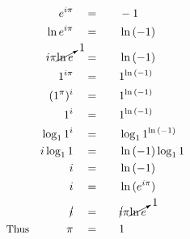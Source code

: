 \begin{alignat*}{5}
&\,&e^{i\pi}\quad&=\quad&&-1\\
&\,&\ln{e^{i\pi}}\quad&=&&\ln{(-1)}\\
&\,&i\pi\cancelto{1}{\ln{e}}\quad&=&&\ln{(-1)}\\
&\,&1^{i\pi}\quad&=&&1^{\ln{(-1)}}\\
&\,&(1^\pi)^i\quad&=&&1^{\ln{(-1)}}\\
&\,&1^i\quad&=&&1^{\ln{(-1)}}\\
&\,&\log_{1}1^i\quad&=&&\log_{1}1^{\ln{(-1)}}\\
&\,&i\log_{1}1\quad&=&&\ln{(-1)}\log_{1}1\\
&\,&i\quad&=&&\ln{(-1)}\\
&\,&i\quad&=&&\ln{(e^{i\pi})}\\
&\,&\cancel{i}\quad&=&&\cancel{i}\pi\cancelto{1}{\ln{e}}\\
&\small\text{Thus}&\pi\quad&=&&1
\end{alignat*}
